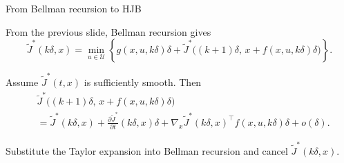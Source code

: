\documentclass[aspectratio=169]{beamer}
\begin{document}
\begin{frame}{From Bellman recursion to HJB}

From the previous slide, Bellman recursion gives
\[
\tilde{J}^*(k\delta,x)
=
\min_{u\in\mathcal U}
\left\{
g(x,u,k\delta)\delta
+
\tilde{J}^*
\bigl((k+1)\delta,\,
x+f(x,u,k\delta)\delta\bigr)
\right\}.
\]

\vspace{0.15cm}

Assume \(\tilde{J}^*(t,x)\) is sufficiently smooth. Then
\[
\begin{aligned}
&\tilde{J}^*
\bigl((k+1)\delta,\,
x+f(x,u,k\delta)\delta\bigr) \\
&=
\tilde{J}^*(k\delta,x)
+
\frac{\partial \tilde{J}^*}{\partial t}(k\delta,x)\delta
+
\nabla_x\tilde{J}^*(k\delta,x)^\top
f(x,u,k\delta)\delta
+
o(\delta).
\end{aligned}
\]

\vspace{0.1cm}

Substitute the Taylor expansion into Bellman recursion and cancel
\(\tilde{J}^*(k\delta,x)\).

\end{frame}
\end{document}
